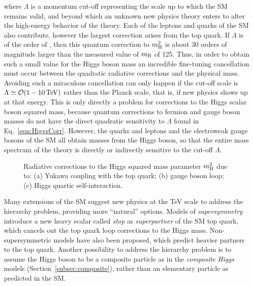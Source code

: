 \noindent where $\Lambda$ is a momentum cut-off representing the scale up to which the SM remains valid, and beyond which an unknown new physics theory enters to alter the high-energy behavior of the theory.
Each of the leptons and quarks of the SM also contribute, however the largest correction arises from the top quark.
If $\Lambda$ is of the order of \MPl, then this quantum correction to $m^2_\mathrm{H}$ is about 30 orders of magnitude larger than the measured value of $m_\mathrm{H}$ of 125\GeV.
Thus, in order to obtain such a small value for the Higgs boson mass an incredible fine-tuning cancellation must occur between the quadratic radiative corrections and the physical mass.
Avoiding such a miraculous cancellation can only happen if the cut-off scale is $\Lambda \simeq \mathcal{O}(1 - 10\,\text{Te\hspace{-.08em}V})$ rather than the Planck scale, that is, if new physics shows up at that energy.
This is only directly a problem for corrections to the Higgs scalar boson squared mass, because quantum corrections to fermion and gauge boson masses do not have the direct
quadratic sensitivity to $\Lambda$ found in Eq.~\ref{eqn:HiggsCorr}. However, the quarks and leptons and the electroweak gauge bosons of the SM all obtain masses from the Higgs boson,
so that the entire mass spectrum of the theory is directly or indirectly sensitive to the cut-off $\Lambda$.

\begin{figure}[!htb]
 \centering
 \caption{Radiative corrections to the Higgs squared mass parameter $m^2_\mathrm{H}$ due to: (a) Yukawa coupling with the top quark; (b) gauge boson loop; (c) Higgs quartic self-interaction.}
 \label{fig:HiggsLoop}
\end{figure}

Many extensions of the SM suggest new physics at the TeV scale to address the hierarchy problem, providing more ``natural'' options.
Models of \textit{supersymmetry}~\cite{PhysRevD.24.1681,Casas:1994qy} introduce a new heavy scalar called \textit{stop} as \textit{superpartner} of the SM top quark,
which cancels out the top quark loop corrections to the Higgs mass. Non-supersymmetric models have also been proposed, which predict heavier partners to the top quark.
Another possibility to address the hierarchy problem is to assume the Higgs boson to be a composite particle as in the \textit{composite Higgs} models (Section~\ref{subsec:composite}),
rather than an elementary particle as predicted in the SM. %


